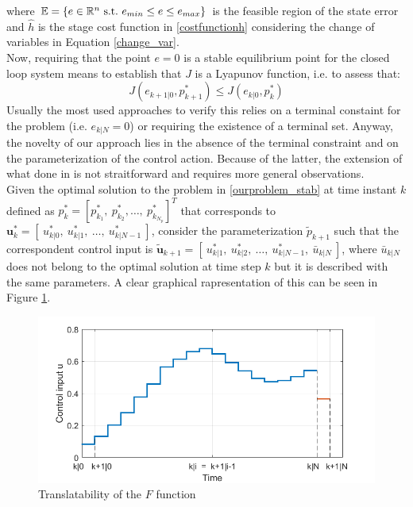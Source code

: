 \documentclass[12pt]{article}
\begin{document}
where $\mathbb{E} = \lbrace {e}\in \mathbb{R}^n\ \textnormal{s.t.}\ {e}_{min}\leq e\leq e_{max} \rbrace$ is the feasible region of the state error and $\hat{h}$ is the stage cost function in \ref{costfunctionh} considering the change of variables in Equation \ref{change_var}. \\
Now, requiring that the point $e=0$ is a stable equilibrium point for the closed loop system means to establish that $J$ is a Lyapunov function, i.e. to assess that: 
\begin{equation}
	J({e}_{k+1|0},p^*_{k+1}) \leq J({e}_{k|0},p^*_k)
	\label{lyap_stab}
\end{equation}
Usually the most used approaches to verify this relies on a terminal constaint for the problem (i.e. $e_{k|N}=0$) or requiring the existence of a terminal set.
Anyway, the novelty of our approach lies in the absence of the terminal constraint and on the parameterization of the control action. Because of the latter, the extension of what done in \cite{alamir2018stability} is not straitforward and requires more general observations. \\
Given the optimal solution to the problem in \ref{ourproblem_stab} at time instant $k$ defined as $p_k^*=\left[ p_{k_1}^*,\ p_{k_2}^*,  \dots,\ p_{k_{N_p}}^* \right]^T$ that corresponds to $  \textbf{u}_k^*=[\ u_{k|0}^*,\ u_{k|1}^*,\  \dots,\  u_{k|{N-1}}^*\ ]$, consider the parameterization $\tilde{p}_{k+1}$ such that the correspondent control input is $  \tilde{\textbf{u}}_{k+1}=[\ u_{k|1}^*,\ u_{k|2}^*,\  \dots,\  u_{k|{N-1}}^*,\ \bar{u}_{k|N} \ ]$, where $\bar{u}_{k|N}$ does not belong to the optimal solution at time step $k$ but it is described with the same parameters. A clear graphical rapresentation of this can be seen in Figure \ref{param_translatability}. 
\begin{figure}[h!]
	\centering
	\includegraphics[scale=0.6]{IMMAGINI/trans_u.png}
	\caption{Translatability of the $F$ function}
	\label{param_translatability}
\end{figure}
\end{document}
